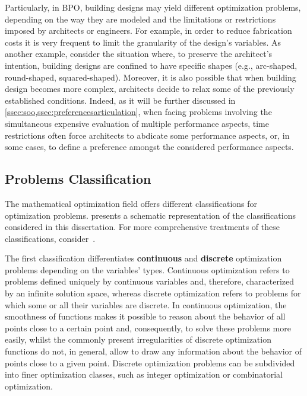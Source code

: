	Particularly, in \ac{BPO}, building designs may yield different optimization problems, depending on the way they are modeled and the limitations or restrictions imposed by architects or engineers. For example, in order to reduce fabrication costs it is very frequent to limit the granularity of the design's variables. As another example, consider the situation where, to preserve the architect's intention, building designs are confined to have specific shapes (e.g., arc-shaped, round-shaped, squared-shaped). Moreover, it is also possible that when building design becomes more complex, architects decide to relax some of the previously established conditions. Indeed, as it will be further discussed in \cref{ssec:soo,ssec:preferencesarticulation}, when facing problems involving the simultaneous expensive evaluation of multiple performance aspects, time restrictions often force architects to abdicate some performance aspects, or, in some cases, to define a preference amongst the considered performance aspects.
	
\subsection{Problems Classification}
	
	The mathematical optimization field offers different classifications for optimization problems.  presents a schematic representation of the classifications considered in this dissertation. For more comprehensive treatments of these classifications, consider~\cite{Koziel2011, Nocedal2011NumericalOptimization}. 
	 
	The first classification differentiates \textbf{continuous} and \textbf{discrete} optimization problems depending on the variables' types. Continuous optimization refers to problems defined uniquely by continuous variables and, therefore, characterized by an infinite solution space, whereas discrete optimization refers to problems for which some or all their variables are discrete. In continuous optimization, the smoothness of functions makes it possible to reason about the behavior of all points close to a certain point and, consequently, to solve these problems more easily, whilst the commonly present irregularities of discrete optimization functions do not, in general, allow to draw any information about the behavior of points close to a given point. Discrete optimization problems can be subdivided into finer optimization classes, such as integer optimization or combinatorial optimization. 
	
